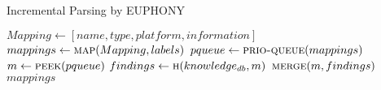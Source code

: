 \begin{algorithm}[!ht]
    \caption{Incremental Parsing by EUPHONY}
    \begin{algorithmic}[1]
        \State{} $Mapping \gets [name, type, platform, information]$
        \State{} $mappings \gets \Call{map}{Mapping, labels}$
        \State{} $pqueue \gets \Call{prio-queue}{mappings}$
        \State{} $m \gets \Call{peek}{pqueue}$
        \State{} $findings \gets \Call{h}{knowledge_{db}, m}$
        \State{} $\Call{merge}{m, findings}$
        \EndFor{}
        \State{} 
        \Else{}
        \State{} 
        \EndIf{}
        \EndWhile{}
        \State{} \Return{} $mappings$
        \EndFunction{}
    \end{algorithmic}
    \label{algorithm:parse}
\end{algorithm}
